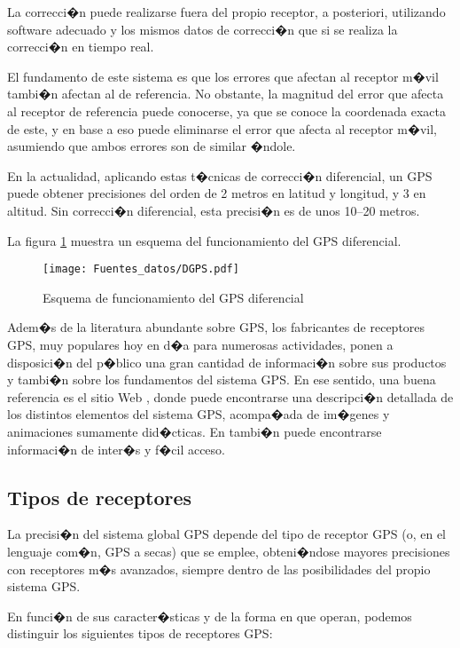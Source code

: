 La correcci�n puede realizarse fuera del propio receptor, a posteriori, utilizando software adecuado y los mismos datos de correcci�n que si se realiza la correcci�n en tiempo real.

El fundamento de este sistema es que los errores que afectan al receptor m�vil tambi�n afectan al de referencia. No obstante, la magnitud del error que afecta al receptor de referencia puede conocerse, ya que se conoce la coordenada exacta de este, y en base a eso puede eliminarse el error que afecta al receptor m�vil, asumiendo que ambos errores son de similar �ndole.

En la actualidad, aplicando estas t�cnicas de correcci�n diferencial, un GPS puede obtener precisiones del orden de 2 metros en latitud y longitud, y 3 en altitud\cite{wikipediaGPS}. Sin correcci�n diferencial, esta precisi�n es de unos 10--20 metros.

La figura \ref{Fig:DGPS} muestra un esquema del funcionamiento del GPS diferencial.

\begin{figure}
\centering
\texttt{[image: Fuentes\_datos/DGPS.pdf]}
\caption{\small Esquema de funcionamiento del GPS diferencial}
\label{Fig:DGPS} 
\end{figure}

Adem�s de la literatura abundante sobre GPS, los fabricantes de receptores GPS, muy populares hoy en d�a para numerosas actividades, ponen a disposici�n del p�blico una gran cantidad de informaci�n sobre sus productos y tambi�n sobre los fundamentos del sistema GPS. En ese sentido, una buena referencia es el sitio Web \cite{webTrimble}, donde puede encontrarse una descripci�n detallada de los distintos elementos del sistema GPS, acompa�ada de im�genes y animaciones sumamente did�cticas. En \cite{webHowWorkGPS} tambi�n puede encontrarse informaci�n de inter�s y f�cil acceso.


\subsection{Tipos de receptores}

La precisi�n del sistema global GPS depende del tipo de receptor GPS (o, en el lenguaje com�n, GPS a secas) que se emplee, obteni�ndose mayores precisiones con receptores m�s avanzados, siempre dentro de las posibilidades del propio sistema GPS.

En funci�n de sus caracter�sticas y de la forma en que operan, podemos distinguir los siguientes tipos de receptores GPS:


